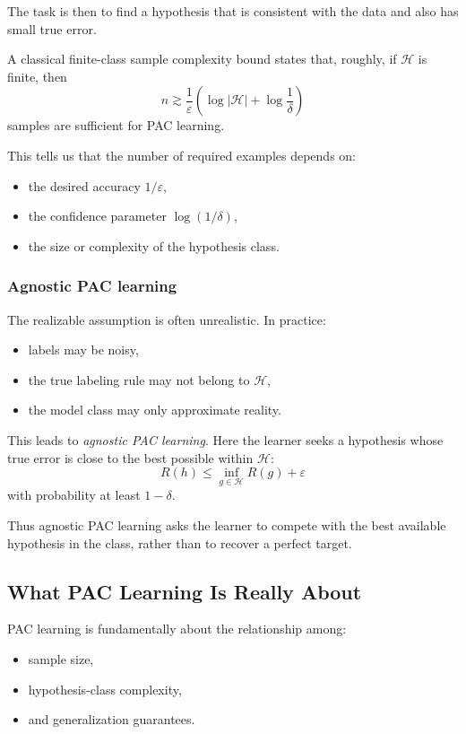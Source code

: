 The task is then to find a hypothesis that is consistent with the data and also has small true error.

A classical finite-class sample complexity bound states that, roughly, if \(\mathcal{H}\) is finite, then
\[
n \gtrsim \frac{1}{\varepsilon}\left(\log |\mathcal{H}| + \log \frac{1}{\delta}\right)
\]
samples are sufficient for PAC learning.

This tells us that the number of required examples depends on:
\begin{itemize}
    \item the desired accuracy \(1/\varepsilon\),
    \item the confidence parameter \(\log(1/\delta)\),
    \item the size or complexity of the hypothesis class.
\end{itemize}

\subsubsection{Agnostic PAC learning}

The realizable assumption is often unrealistic. In practice:
\begin{itemize}
    \item labels may be noisy,
    \item the true labeling rule may not belong to \(\mathcal{H}\),
    \item the model class may only approximate reality.
\end{itemize}

This leads to \emph{agnostic PAC learning}. Here the learner seeks a hypothesis whose true error is close to the best possible within \(\mathcal{H}\):
\[
R(h)\le \inf_{g\in \mathcal{H}} R(g) + \varepsilon
\]
with probability at least \(1-\delta\).

Thus agnostic PAC learning asks the learner to compete with the best available hypothesis in the class, rather than to recover a perfect target.

\subsection{What PAC Learning Is Really About}

PAC learning is fundamentally about the relationship among:
\begin{itemize}
    \item sample size,
    \item hypothesis-class complexity,
    \item and generalization guarantees.
\end{itemize}

